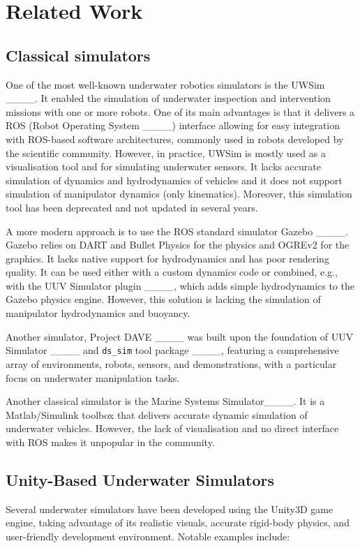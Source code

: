 \section{Related Work}
\subsection{Classical simulators}

One of the most well-known underwater robotics simulators is the UWSim ____.  It enabled the simulation of underwater inspection and intervention missions with one or more robots. One of its main advantages is that it delivers a ROS (Robot Operating System ____) interface allowing for easy integration with ROS-based software architectures, commonly used in robots developed by the scientific community. 
However, in practice, UWSim is mostly used as a visualisation tool and for simulating underwater sensors. It lacks accurate simulation of dynamics and hydrodynamics of vehicles and it does not support simulation of manipulator dynamics (only kinematics). Moreover, this simulation tool has been deprecated and not updated in several years.

A more modern approach is to use the ROS standard simulator Gazebo ____. Gazebo relies on DART and Bullet Physics for the physics and OGREv2 for the graphics. It lacks native support for hydrodynamics and has poor rendering quality. It can be used either with a custom dynamics code or combined, e.g., with the UUV Simulator plugin ____, which adds simple hydrodynamics to the Gazebo physics engine. However, this solution is lacking the simulation of manipulator hydrodynamics and buoyancy. 

Another simulator, Project DAVE ____ was built upon the foundation of UUV Simulator ____ and \texttt{ds\_sim} tool package ____, featuring a comprehensive array of environments, robots, sensors, and demonstrations, with a particular focus on underwater manipulation tasks.

Another classical simulator is the Marine Systems Simulator____. It is a Matlab/Simulink toolbox that delivers accurate dynamic simulation of underwater vehicles. However, the lack of visualisation and no direct interface with ROS makes it unpopular in the community.


\subsection{Unity-Based Underwater Simulators}
Several underwater simulators have been developed using the Unity3D game engine, taking advantage of its realistic visuals, accurate rigid-body physics, and user-friendly development environment. Notable examples include:

